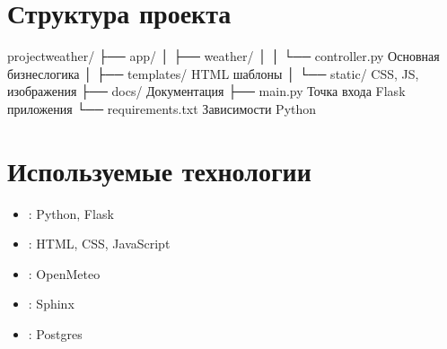 \documentclass[letterpaper,10pt,russian]{sphinxmanual}
\begin{document}
\begin{sphinxVerbatim}[commandchars=\\\{\}]
\PYG{p}{[\PYGZob{}}
\PYG{p}{\PYGZcb{}]}
\end{sphinxVerbatim}


\chapter{Структура проекта}
\label{\detokenize{index:id3}}
\begin{sphinxVerbatim}[commandchars=\\\{\}]
project\PYGZhy{}weather/
├── app/
│   ├── weather/
│   │   └── controller.py    \PYGZsh{} Основная бизнес\PYGZhy{}логика
│   ├── templates/           \PYGZsh{} HTML шаблоны
│   └── static/             \PYGZsh{} CSS, JS, изображения
├── docs/                   \PYGZsh{} Документация
├── main.py                \PYGZsh{} Точка входа Flask приложения
└── requirements.txt       \PYGZsh{} Зависимости Python
\end{sphinxVerbatim}


\chapter{Используемые технологии}
\label{\detokenize{index:id4}}\begin{itemize}
\item {} 
\sphinxAtStartPar
{}: Python, Flask

\item {} 
\sphinxAtStartPar
{}: HTML, CSS, JavaScript

\item {} 
\sphinxAtStartPar
{}: Open\sphinxhyphen{}Meteo

\item {} 
\sphinxAtStartPar
{}: Sphinx

\item {} 
\sphinxAtStartPar
{}: Postgres

\end{itemize}
\end{document}
